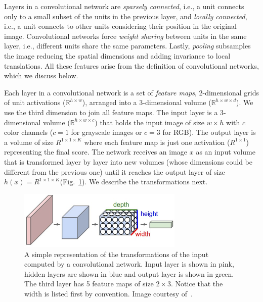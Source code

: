 Layers in a convolutional network are \emph{sparsely connected}, i.e., a unit connects only to a small subset of the units in the previous layer, and \emph{locally connected}, i.e., a unit connects to other units considering their position in the original image. Convolutional networks force \emph{weight sharing} between units in the same layer, i.e., different units share the same parameters. Lastly, \emph{pooling} subsamples the image reducing the spatial dimensions and adding invariance to local translations. All these features arise from the definition of convolutional networks, which we discuss below.

Each layer in a convolutional network is a set of \emph{feature maps}, 2-dimensional grids of unit activations ($\mathbb{R}^{h\times w}$), arranged into a 3-dimensional volume ($\mathbb{R}^{h\times w \times d}$). We use the third dimension to join all feature maps.
The input layer is a 3-dimensional volume ($\mathbb{R}^{h\times w \times c}$) that holds the input image of size $w\times h$ with $c$ color channels ($c = 1$ for grayscale images or $c = 3$ for RGB). The output layer is a volume of size $R^{1\times 1 \times K}$ where each feature map is just one activation ($R^{1\times 1}$) representing the final score. The network receives an image $x$ as an input volume that is transformed layer by layer into new volumes (whose dimensions could be different from the previous one) until it reaches the output layer of size $h(x) = R^{1\times 1 \times K}$(Fig.~\ref{fig:ConvNetVolumes}). We describe the transformations next.
\begin{figure}[h]
	\centering
	\includegraphics[width = 0.7\textwidth]{plots/convNetVolumes.jpeg}
	\caption[Convolutional network visualization]{A simple representation of the transformations of the input computed by a convolutional network. Input layer is shown in pink, hidden layers are shown in blue and output layer is shown in green. The third layer has 5 feature maps of size $2\times3$. Notice that the width is listed first by convention. Image courtesy of~\cite{Karpathy2015}.}
	\label{fig:ConvNetVolumes}
\end{figure}

